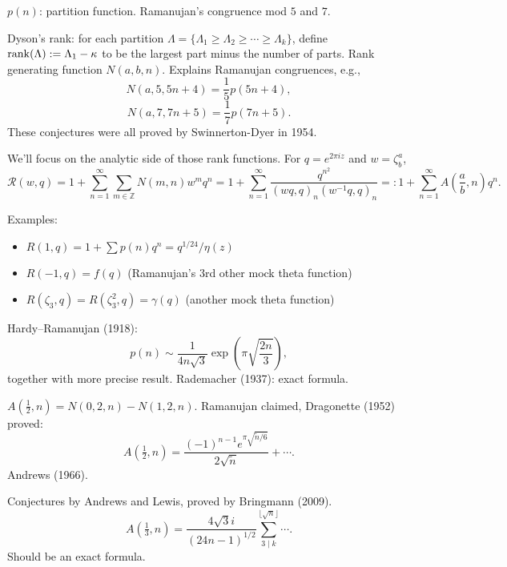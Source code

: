 \documentclass[reqno]{amsart} 
\begin{document}
$p(n)$: partition function.  Ramanujan's congruence mod $5$ and $7$.

Dyson's rank: for each partition $\Lambda = \{\Lambda_1 \geq \Lambda_2 \geq \dotsb \geq \Lambda_k\}$, define $\operatorname{rank}(\Lambda) := \Lambda_1 - \kappa$ to be the largest part minus the number of parts.  Rank generating function $N(a, b, n)$.  Explains Ramanujan congruences, e.g.,
\begin{equation*}
  N(a, 5, 5 n + 4) = \frac{1}{5} p(5 n + 4),
\end{equation*}
\begin{equation*}
  N(a, 7, 7 n + 5) = \frac{1}{7} p(7 n + 5).
\end{equation*}
These conjectures were all proved by Swinnerton-Dyer in 1954.

We'll focus on the analytic side of those rank functions.  For $q = e^{2 \pi i z}$ and $w = \zeta_b^a$,
\begin{equation*}
  \mathcal{R}(w, q) = 1 + \sum_{n = 1}^\infty \sum_{m \in \mathbb{Z}} N(m, n)
  w^m q^n
  =
  1 + \sum_{n = 1}^\infty \frac{q^{n^2}}{(w q, q)_n(w^{-1} q, q)_n}
  =: 1 + \sum_{n = 1}^\infty A \left( \frac{a}{b}, n \right) q^n.
\end{equation*}

Examples:
\begin{itemize}
\item $R(1, q) = 1 + \sum p(n) q^n = q^{1/24} / \eta(z)$
\item $R(- 1, q) = f(q)$ (Ramanujan's $3$rd other mock theta function)
\item $R(\zeta_3, q) = R(\zeta_3^2, q) = \gamma(q)$ (another mock theta function)
\end{itemize}

Hardy--Ramanujan (1918):
\begin{equation*}
  p(n) \sim \frac{1}{4 n \sqrt{3}}
  \exp \left( \pi \sqrt{\frac{2 n}{3}} \right),
\end{equation*}
together with more precise result.  Rademacher (1937): exact formula.

$A(\tfrac{1}{2} , n) = N(0, 2, n) - N(1, 2, n)$.  Ramanujan claimed, Dragonette (1952) proved:
\begin{equation*}
  A(\tfrac{1}{2} , n) = \frac{(- 1)^{n - 1} e^{\pi \sqrt{\tilde{n}/6}}}{2 \sqrt{\tilde{n}}} + \dotsb.
\end{equation*}
Andrews (1966).

Conjectures by Andrews and Lewis, proved by Bringmann (2009).
\begin{equation*}
  A(\tfrac{1}{3} , n) = \frac{4 \sqrt{3}i}{(24 n - 1)^{1/2}}
  \sum_{3 \mid k}^{\lfloor \sqrt{n} \rfloor}
  \dotsb.
\end{equation*}
Should be an exact formula.
\end{document}

